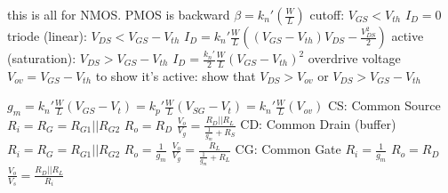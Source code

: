 \documentclass[12pt]{article}
\begin{document}
\begin{spacing}{0.8}
\begin{multicols*}{2}
\begin{flushleft}
\begin{outline}[longenum]
  \1 this is all for NMOS. PMOS is backward
  \1 $\beta = k_n' (\frac{W}{L})$
  \1 cutoff: $V_{GS} < V_{th}$
    \2 $I_D=0$
  \1 triode (linear): $V_{DS} < V_{GS}-V_{th}$
    \2 $I_D = k_n' \frac{W}{L}
    \left( (V_{GS}-V_{th})V_{DS} - \frac{V_{DS}^2}{2} \right)$
  \1 active (saturation): $V_{DS} > V_{GS}-V_{th}$
    \2 $I_D = \frac{k_n'}{2}\frac{W}{L}(V_{GS}-V_{th})^2$
    \2 overdrive voltage $V_{ov}=V_{GS}-V_{th}$
  \1 to show it's active: show that $V_{DS} > V_{ov}$ or $V_{DS} > V_{GS} - V_{th}$

  \1 $g_m
    = k_n' \frac{W}{L}(V_{GS}-V_t)
    = k_p' \frac{W}{L}(V_{SG}-V_t)
    = k_n' \frac{W}{L}(V_{ov})
    $
  \1 CS: Common Source
    \2 $R_i=R_G=R_{G1}||R_{G2}$
    \2 $R_o=R_D$
    \2 $\frac{V_o}{V_g}=\frac{R_D||R_L}{\frac{1}{g_m}+R_S}$
  \1 CD: Common Drain (buffer)
    \2 $R_i=R_G=R_{G1}||R_{G2}$
    \2 $R_o=\frac{1}{g_m}$
    \2 $\frac{V_o}{V_g}=\frac{R_L}{\frac{1}{g_m}+R_L}$
  \1 CG: Common Gate
    \2 $R_i=\frac{1}{g_m}$
    \2 $R_o=R_D$
    \2 $\frac{V_o}{V_s}=\frac{R_D||R_L}{R_i}$




\end{outline}
\end{flushleft}
\end{multicols*}
\end{spacing}
\end{document}
